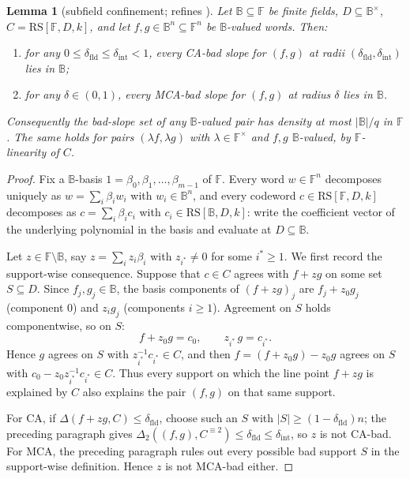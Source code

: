 \documentclass[11pt]{article}
\newtheorem{lemma}[lemma]{Lemma}
\theoremstyle{definition}
\theoremstyle{remark}
\newcommand{\F}{\mathbb{F}}
\newcommand{\B}{\mathbb{B}}
\newcommand{\RS}{\mathrm{RS}}
\newcommand{\dist}{\Delta}
\begin{document}
\begin{lemma}[subfield confinement; refines {\cite{Cho26b}}]\label{lem:confine}
Let $\B\subseteq\F$ be finite fields, $D\subseteq\B^\times$, $C=\RS[\F,D,k]$, and let $f,g\in\B^n\subseteq\F^n$ be $\B$-valued words. Then:
\begin{enumerate}[label=\textup{(\alph*)}]
\item for any $0\le\delta_{\mathrm{fld}}\le\delta_{\mathrm{int}}<1$, every CA-bad slope for $(f,g)$ at radii $(\delta_{\mathrm{fld}},\delta_{\mathrm{int}})$ lies in $\B$;
\item for any $\delta\in(0,1)$, every MCA-bad slope for $(f,g)$ at radius $\delta$ lies in $\B$.
\end{enumerate}
Consequently the bad-slope set of any $\B$-valued pair has density at most $|\B|/q$ in $\F$. The same holds for pairs $(\lambda f,\lambda g)$ with $\lambda\in\F^\times$ and $f,g$ $\B$-valued, by $\F$-linearity of $C$.
\end{lemma}

\begin{proof}
Fix a $\B$-basis $1=\beta_0,\beta_1,\dots,\beta_{m-1}$ of $\F$. Every word $w\in\F^n$ decomposes uniquely as $w=\sum_i\beta_i w_i$ with $w_i\in\B^n$, and every codeword $c\in\RS[\F,D,k]$ decomposes as $c=\sum_i\beta_i c_i$ with $c_i\in\RS[\B,D,k]$: write the coefficient vector of the underlying polynomial in the basis and evaluate at $D\subseteq\B$.

Let $z\in\F\setminus\B$, say $z=\sum_iz_i\beta_i$ with $z_{i^*}\ne0$ for some $i^*\ge1$. We first record the support-wise consequence. Suppose that $c\in C$ agrees with $f+zg$ on some set $S\subseteq D$. Since $f_j,g_j\in\B$, the basis components of $(f+zg)_j$ are $f_j+z_0g_j$ (component $0$) and $z_ig_j$ (components $i\ge1$). Agreement on $S$ holds componentwise, so on $S$:
\[
f+z_0g=c_0,\qquad z_{i^*}\,g=c_{i^*}.
\]
Hence $g$ agrees on $S$ with $z_{i^*}^{-1}c_{i^*}\in C$, and then $f=(f+z_0g)-z_0g$ agrees on $S$ with $c_0-z_0z_{i^*}^{-1}c_{i^*}\in C$. Thus every support on which the line point $f+zg$ is explained by $C$ also explains the pair $(f,g)$ on that same support.

For CA, if $\dist(f+zg,C)\le\delta_{\mathrm{fld}}$, choose such an $S$ with $|S|\ge(1-\delta_{\mathrm{fld}})n$; the preceding paragraph gives $\dist_2((f,g),C^{\equiv2})\le\delta_{\mathrm{fld}}\le\delta_{\mathrm{int}}$, so $z$ is not CA-bad. For MCA, the preceding paragraph rules out every possible bad support $S$ in the support-wise definition. Hence $z$ is not MCA-bad either.
\end{proof}
\end{document}

